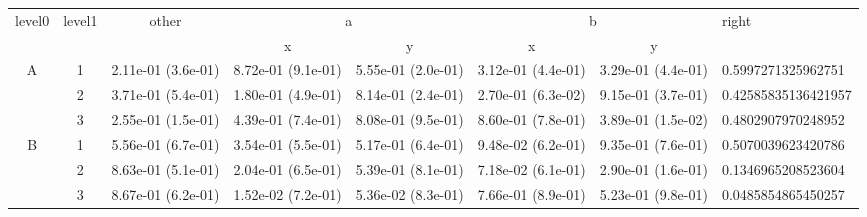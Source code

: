 \begin{tabular}{cccccccl}
\toprule
\multirow{2}{*}{level0} & \multirow{2}{*}{level1}& \multirow{2}{*}{other}&\multicolumn{2}{c}{a}&\multicolumn{2}{c}{b}& \multirow{2}{*}{right}\tabularnewline
\cmidrule(lr){4-5}
\cmidrule(lr){6-7}
&&&x&y&x&y\tabularnewline
\midrule
\multirow{3}{*}{A}&1& 2.11e-01 (3.6e-01)& 8.72e-01 (9.1e-01)& 5.55e-01 (2.0e-01)& 3.12e-01 (4.4e-01)& 3.29e-01 (4.4e-01)& 0.5997271325962751\tabularnewline
&2& 3.71e-01 (5.4e-01)& 1.80e-01 (4.9e-01)& 8.14e-01 (2.4e-01)& 2.70e-01 (6.3e-02)& 9.15e-01 (3.7e-01)& 0.42585835136421957\tabularnewline
&3& 2.55e-01 (1.5e-01)& 4.39e-01 (7.4e-01)& 8.08e-01 (9.5e-01)& 8.60e-01 (7.8e-01)& 3.89e-01 (1.5e-02)& 0.4802907970248952\tabularnewline
\midrule
\multirow{3}{*}{B}&1& 5.56e-01 (6.7e-01)& 3.54e-01 (5.5e-01)& 5.17e-01 (6.4e-01)& 9.48e-02 (6.2e-01)& 9.35e-01 (7.6e-01)& 0.5070039623420786\tabularnewline
&2& 8.63e-01 (5.1e-01)& 2.04e-01 (6.5e-01)& 5.39e-01 (8.1e-01)& 7.18e-02 (6.1e-01)& 2.90e-01 (1.6e-01)& 0.1346965208523604\tabularnewline
&3& 8.67e-01 (6.2e-01)& 1.52e-02 (7.2e-01)& 5.36e-02 (8.3e-01)& 7.66e-01 (8.9e-01)& 5.23e-01 (9.8e-01)& 0.0485854865450257\tabularnewline
\bottomrule
\end{tabular}
